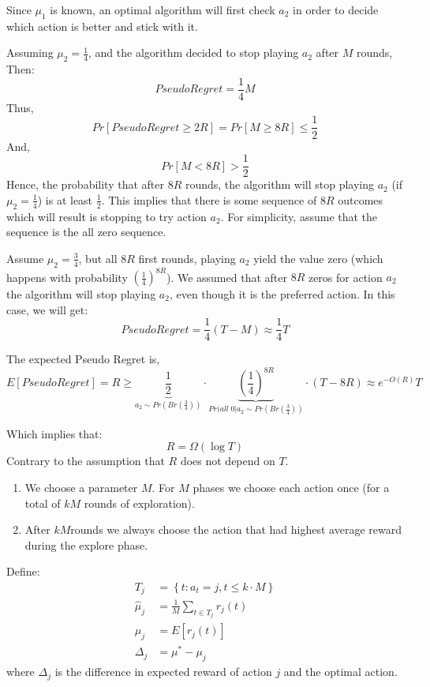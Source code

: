 Since $\mu_1$ is known, an optimal algorithm will first check $a_2$
in order to decide which action is better and stick with it.

Assuming $\mu_2 = \frac{1}{4}$, and the algorithm decided to stop
playing $a_2$ after $M$ rounds, Then:
\[
Pseudo Regret = \frac{1}{4}M
\]
Thus,
\[
Pr\left[Pseudo Regret\ge 2R \right] = Pr\left[ M\ge 8R
\right]\le\frac{1}{2}
\]
And,
\[
Pr\left[M < 8R \right]>\frac{1}{2}
\]
Hence, the probability that after $8R$ rounds, the algorithm will
stop playing $a_2$ (if $\mu_2 = \frac{1}{4}$) is at least
$\frac{1}{2}$. This implies that there is some sequence of $8R$
outcomes which will result is stopping to try action $a_2$. For
simplicity, assume that the sequence is the all zero sequence.

Assume $\mu_2 = \frac{3}{4}$, but all $8R$ first rounds, playing
$a_2$ yield the value zero (which happens with probability
$\left(\frac{1}{4}\right)^{8R}$). We assumed that after $8R$ zeros
for action $a_2$ the algorithm will stop playing $a_2$, even though
it is the preferred action. In this case, we will get:
\[
Pseudo Regret = \frac{1}{4} (T - M) \approx \frac{1}{4}T
\]

The expected Pseudo Regret is,
\[
E\left[Pseudo Regret\right] = R \geq
\underbrace{\frac{1}{2}}_{a_{2}\sim Pr(Br\left(\frac{3}{4}\right))}
\cdot \underbrace{\left(\frac{1}{4}\right)^{8R}}_{Pr(all \; 0 |
a_{2}\sim Pr(Br\left(\frac{3}{4}\right))} \cdot (T - 8R) \approx
e^{-O(R)}T
\]

Which implies that:
\[
R=\Omega\left(\log T\right)
\]
Contrary to the assumption that $R$ does not depend on $T$.


\begin{enumerate}
%
\item We choose a parameter $M$.
%
For $M$ phases we choose each action once (for a total of $kM$
rounds of exploration).
%
\item After $kM$rounds we always choose the action that had highest
average reward during the explore phase.
\end{enumerate}

Define:
\begin{align*}
T_{j}&= \left\{ t:a_t=j,t\le k\cdot M\right\}\\
\hat{\mu}_{j}&=\frac{1}{M} \sum_{t\in T_{j}}r_{j}(t)\\
\mu_{j}&=E[r_{j}(t)]\\
\Delta_{j}&=\mu^{*}-\mu_{j}
\end{align*}
where $\Delta_j$ is the difference in expected reward of action $j$
and the optimal action.

